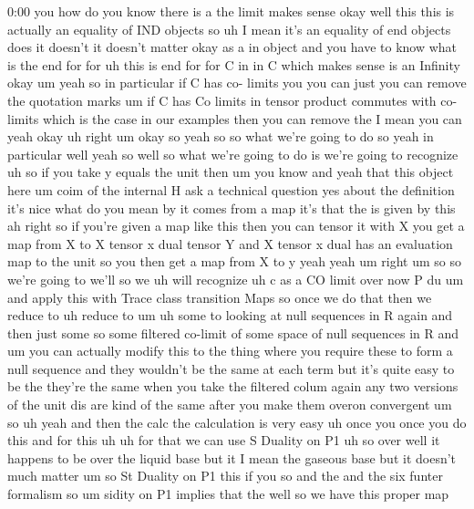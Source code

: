 \begin{unfinished}{0:00}
you  how  do  you  know  there  is  a  the  limit
makes
sense
okay  well  this  this  is  actually  an
equality  of  IND  objects  so  uh  I  mean
it's  an  equality  of  end  objects
does  it  doesn't  it  doesn't  matter  okay
as  a  in  object  and  you  have  to  know  what
is  the  end  for  for
uh  this  is  end  for  for  C  in  in  C  which
makes  sense  is  an  Infinity
okay
um  yeah  so  in  particular  if  C  has  co-
limits  you  you  can  just  you  can  remove
the  quotation  marks  um  if  C  has  Co
limits  in  tensor  product  commutes  with
co-  limits  which  is  the  case  in  our
examples  then  you  can  remove  the  I  mean
you
can  yeah
okay  uh  right  um  okay  so  yeah
so  so  what  we're  going  to  do  so  yeah  in
particular  well  yeah  so
well  so  what  we're  going  to  do  is  we're
going  to  recognize  uh  so  if  you  take  y
equals  the  unit  then  um  you  know  and
yeah  that  this  object  here
um  coim  of  the  internal  H  ask  a
technical  question  yes  about  the
definition  it's  nice  what  do  you  mean  by
it  comes  from  a  map  it's  that  the  is
given  by  this  ah  right  so  if  you're
given  a  map  like  this  then  you  can
tensor  it  with  X  you  get  a  map  from  X  to
X  tensor  x  dual  tensor  Y  and  X  tensor  x
dual  has  an  evaluation  map  to  the  unit
so  you  then  get  a  map  from  X  to  y  yeah
yeah
um  right  um  so  so  we're  going  to  we'll
so  we  uh  will
recognize
uh  c  as
a  CO  limit  over  now  P
du
um  and  apply
this  with  Trace  class  transition
Maps  so  once  we  do  that  then  we  reduce
to
uh  reduce  to  um  uh  some  to  looking  at
null  sequences  in  R  again  and  then  just
some
so  some  filtered  co-limit  of  some  space
of  null  sequences  in  R  and
um  you  can  actually  modify  this  to  the
thing  where  you  require  these  to  form  a
null  sequence  and  they  wouldn't  be  the
same  at  each  term  but  it's  quite  easy  to
be  the  they're  the  same  when  you  take
the  filtered  colum  again  any  two
versions  of  the  unit  dis  are  kind  of  the
same  after  you  make  them  overon
convergent  um  so  uh  yeah  and  then  the
calc  the  calculation  is  very  easy  uh
once  you  once  you  do
this  and  for  this
uh  uh  for  that  we  can  use  S
Duality  on
P1
uh  so  over  well  it  happens  to  be  over
the  liquid  base  but  it  I  mean  the
gaseous  base  but  it  doesn't  much  matter
um  so  St  Duality  on  P1  this  if  you  so
and  the  and  the  six  funter
formalism  so  um  sidity  on  P1  implies
that  the  well  so  we  have  this  proper  map

\end{unfinished}
